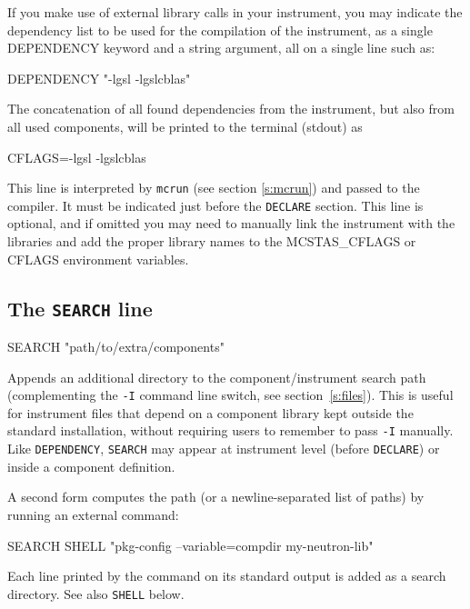 If you make use of external library calls in your instrument, you may indicate 
the dependency list to be used for the compilation of the instrument, as a single 
DEPENDENCY keyword and a string argument, all on a single line such as:
\begin{mcstas}
DEPENDENCY "-lgsl -lgslcblas"
\end{mcstas}
The concatenation of all found dependencies from the instrument, but also from 
all used components, will be printed to the terminal (stdout) as
\begin{mcstas}
CFLAGS=-lgsl -lgslcblas
\end{mcstas}
This line is interpreted by \verb+mcrun+ (see section \ref{s:mcrun}) and passed 
to the compiler. It must be indicated just before the \texttt{DECLARE} section.
This line is optional, and if omitted you may need to manually link the instrument with the libraries and add the proper library names to the MCSTAS\_CFLAGS or CFLAGS environment variables.

\subsection{The \texttt{SEARCH} line}
\label{s:search}
\begin{mcstas}
SEARCH "path/to/extra/components"
\end{mcstas}
Appends an additional directory to the component/instrument search path
(complementing the \texttt{-I} command line switch, see section~\ref{s:files}).
This is useful for instrument files that depend on a component library kept
outside the standard \MCS installation, without requiring users to remember
to pass \texttt{-I} manually. Like \texttt{DEPENDENCY}, \texttt{SEARCH} may
appear at instrument level (before \texttt{DECLARE}) or inside a component
definition.

A second form computes the path (or a newline-separated list of paths) by
running an external command:
\begin{mcstas}
SEARCH SHELL "pkg-config --variable=compdir my-neutron-lib"
\end{mcstas}
Each line printed by the command on its standard output is added as a
search directory. See also \texttt{SHELL} below.

